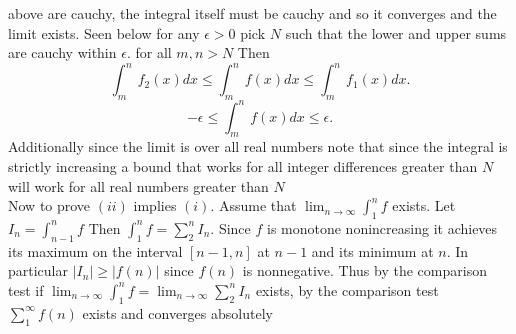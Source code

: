 \documentclass{amsart}
\begin{document}
    above are cauchy, the integral itself must be cauchy and so it converges and the limit exists.
    Seen below
    for any $\epsilon > 0$ pick $N$ such that the lower and upper sums are cauchy within $\epsilon$. for all $m,n > N$
    Then
     \[
         \int_{m}^{n}f_2(x)dx \le \int_{m}^{n}f(x)dx \le \int_{m}^{n}f_1(x)dx
    .\] 
    \[
    -\epsilon \le \int_{m}^{n}f(x)dx \le \epsilon
    .\] 
    Additionally since the limit is over all real numbers note that since the integral is strictly increasing a bound that works for all integer differences greater than $N$ will work
    for all real numbers greater than $N$\\
    Now to prove $(ii)$ implies $(i)$. Assume that $\lim_{n\to \infty}\int_{1}^{n}f$ exists. Let $I_n = \int_{n-1}^{n}f$ Then $\int_{1}^{n}f = \sum_{2}^{n}I_n$.
    Since $f$ is monotone nonincreasing it achieves its maximum on the interval $[n-1,n]$ at $n-1$ and its minimum at $n$. In particular $|I_n| \ge |f(n)|$ since $f(n)$ is nonnegative.
    Thus by the comparison test if  $\lim_{n\to \infty}\int_{1}^{n}f = \lim_{n\to \infty}\sum_{2}^{n}I_n$  exists, by the comparison test $\sum_{1}^{\infty}f(n)$ exists and converges absolutely
\end{document}
